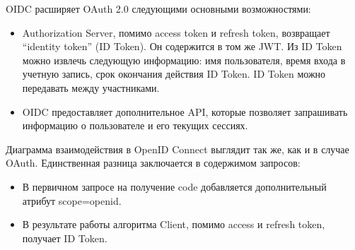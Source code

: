 OIDC расширяет OAuth 2.0 следующими основными возможностями:

\begin{itemize}
    \item Authorization Server, помимо access token и refresh token, возвращает “identity token” (ID Token). Он содержится в том же JWT. Из ID Token можно извлечь следующую информацию: имя пользователя, время входа в учетную запись, срок окончания действия ID Token. ID Token можно передавать между участниками.
    \item OIDC предоставляет дополнительное API, которые позволяет запрашивать информацию о пользователе и его текущих сессиях.\autocite{IDToken}
\end{itemize}

Диаграмма взаимодействия в OpenID Connect выглядит так же, как и в случае OAuth. Единственная разница заключается в содержимом запросов:

\begin{itemize}
    \item В первичном запросе на получение code добавляется дополнительный атрибут scope=openid.
    \item В результате работы алгоритма Client, помимо access и refresh token, получает ID Token.\autocite{IDToken}
\end{itemize}
